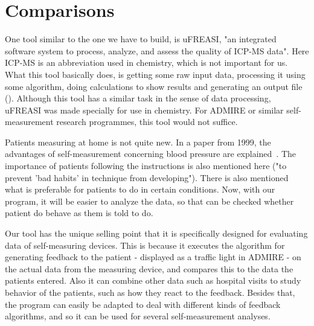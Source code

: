 \documentclass[11pt,twoside,a4paper]{article}
\begin{document}
\section{Comparisons}
One tool similar to the one we have to build, is uFREASI, "an integrated software system to process, analyze, and assess the quality of ICP-MS data". Here ICP-MS is an abbreviation used in chemistry, which is not important for us. What this tool basically does, is getting some raw input data, processing it using some algorithm, doing calculations to show results and generating an output file (\cite{UFREASI}).
Although this tool has a similar task in the sense of data processing, uFREASI was made specially for use in chemistry. For ADMIRE or similar self-measurement research programmes, this tool would not suffice.

Patients measuring at home is not quite new. In a paper from 1999, the advantages of self-measurement concerning blood pressure are explained~\autocite{BloodPressure}. The importance of patients following the instructions is also mentioned here ("to prevent 'bad habits' in technique from developing"). There is also mentioned what is preferable for patients to do in certain conditions. Now, with our program, it will be easier to analyze the data, so that can be checked whether patient do behave as them is told to do.   

Our tool has the unique selling point that it is specifically designed for evaluating data of self-measuring devices. This is because it executes the algorithm for generating feedback to the patient - displayed as a traffic light in ADMIRE - on the actual data from the measuring device, and compares this to the data the patients entered. Also it can combine other data such as hospital visits to study behavior of the patients, such as how they react to the feedback. Besides that, the program can easily be adapted to deal with different kinds of feedback algorithms, and so it can be used for several self-measurement analyses.

\newpage
\printbibliography[heading=bibintoc]
\end{document}
